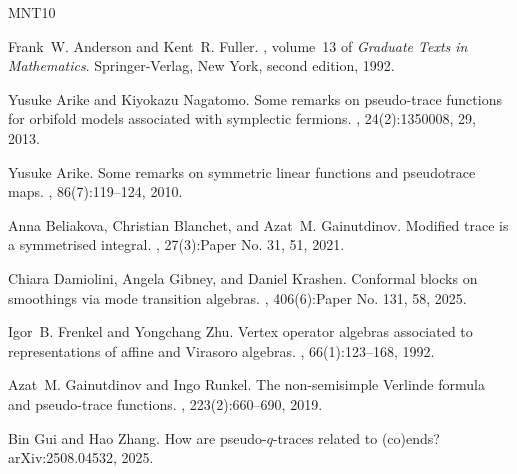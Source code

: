 \documentclass[11pt,b5paper,notitlepage]{article}
\theoremstyle{definition}
\theoremstyle{plain}
\numberwithin{equation}{section}
\begin{document}
 














 








\footnotesize
	
%    


\begin{thebibliography}{MNT10}

Frank~W. Anderson and Kent~R. Fuller.
, volume~13 of {\em Graduate
  Texts in Mathematics}.
\newblock Springer-Verlag, New York, second edition, 1992.

Yusuke Arike and Kiyokazu Nagatomo.
\newblock Some remarks on pseudo-trace functions for orbifold models associated
  with symplectic fermions.
, 24(2):1350008, 29, 2013.

Yusuke Arike.
\newblock Some remarks on symmetric linear functions and pseudotrace maps.
, 86(7):119--124, 2010.

Anna Beliakova, Christian Blanchet, and Azat~M. Gainutdinov.
\newblock Modified trace is a symmetrised integral.
, 27(3):Paper No. 31, 51, 2021.

Chiara Damiolini, Angela Gibney, and Daniel Krashen.
\newblock Conformal blocks on smoothings via mode transition algebras.
, 406(6):Paper No. 131, 58, 2025.

Igor~B. Frenkel and Yongchang Zhu.
\newblock Vertex operator algebras associated to representations of affine and
  {V}irasoro algebras.
, 66(1):123--168, 1992.

Azat~M. Gainutdinov and Ingo Runkel.
\newblock The non-semisimple {V}erlinde formula and pseudo-trace functions.
, 223(2):660--690, 2019.

Bin Gui and Hao Zhang.
\newblock How are pseudo-$q$-traces related to (co)ends?
\newblock arXiv:2508.04532, 2025.


\end{thebibliography}
\end{document}
